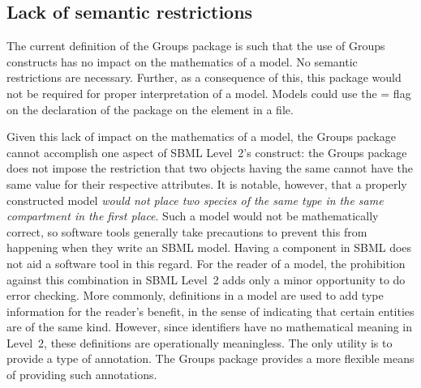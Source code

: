 \subsection{Lack of semantic restrictions}
\label{semantic-restrictions}

The current definition of the Groups package is such that the use of Groups constructs has no impact on the mathematics of a model.  No semantic restrictions are necessary. Further, as a consequence of this, this package would not be required for proper interpretation of a model. Models could use the = flag on the declaration of the package on the  element in a file.

Given this lack of impact on the mathematics of a model, the Groups package cannot accomplish one aspect of SBML Level~2's \SpeciesType construct: the Groups package does not impose the restriction that two \Species objects having the same \SpeciesType cannot have the same value for their respective  attributes.  It is notable, however, that a properly constructed model \emph{would not place two species of the same type in the same compartment in the first place}.  Such a model would not be mathematically correct, so software tools generally take precautions to prevent this from happening when they write an SBML model.  Having a \SpeciesType component in SBML does not aid a software tool in this regard.  For the reader of a model, the prohibition against this combination in SBML Level~2 adds only a minor opportunity to do error checking.  More commonly, \SpeciesType definitions in a model are used to add type information for the reader's benefit, in the sense of indicating that certain entities are of the same kind.  However, since \SpeciesType identifiers have no mathematical meaning in Level~2, these definitions are operationally meaningless.  The only utility is to provide a type of annotation.  The Groups package provides a more flexible means of providing such annotations.

